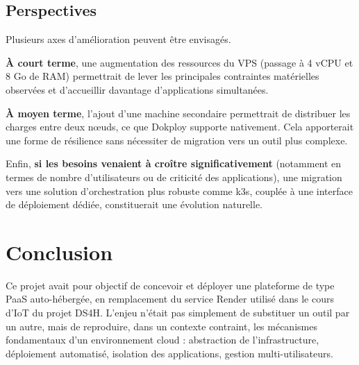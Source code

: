 \documentclass{rapportClass} %
\begin{document}

\section{Perspectives}

Plusieurs axes d'amélioration peuvent être envisagés.

\textbf{À court terme}, une augmentation des ressources du VPS (passage à 4
vCPU et 8 Go de RAM) permettrait de lever les principales contraintes
matérielles observées et d'accueillir davantage d'applications
simultanées.

\textbf{À moyen terme}, l'ajout d'une machine secondaire permettrait de
distribuer les charges entre deux nœuds, ce que Dokploy supporte
nativement. Cela apporterait une forme de résilience sans nécessiter
de migration vers un outil plus complexe.

Enfin, \textbf{si les besoins venaient à croître significativement} (notamment
en termes de nombre d'utilisateurs ou de criticité des applications),
une migration vers une solution d'orchestration plus robuste comme
k3s, couplée à une interface de déploiement dédiée, constituerait une
évolution naturelle.

\chapter{Conclusion}

Ce projet avait pour objectif de concevoir et déployer une plateforme de type PaaS auto-hébergée, 
en remplacement du service Render utilisé dans le cours d'IoT du projet DS4H. 
L'enjeu n'était pas simplement de substituer un outil par un autre, mais de reproduire, dans un contexte contraint, 
les mécanismes fondamentaux d'un environnement cloud : abstraction de l'infrastructure, 
déploiement automatisé, isolation des applications, gestion multi-utilisateurs.
\end{document}
